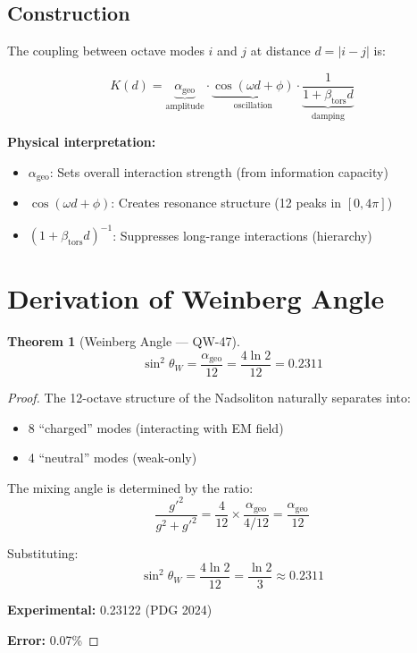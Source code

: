 \documentclass[11pt, a4paper]{article}
\newtheorem{theorem}{Theorem}[section]
\theoremstyle{remark}
\newcommand{\alphageo}{\alpha_{\text{geo}}}
\newcommand{\betators}{\beta_{\text{tors}}}
\begin{document}
\subsection{Construction}

The coupling between octave modes $i$ and $j$ at distance $d = |i - j|$ is:

\begin{equation}
K(d) = \underbrace{\alphageo}_{\text{amplitude}} \cdot \underbrace{\cos(\omega d + \phi)}_{\text{oscillation}} \cdot \underbrace{\frac{1}{1 + \betators d}}_{\text{damping}}
\end{equation}

\textbf{Physical interpretation:}
\begin{itemize}
    \item $\alphageo$: Sets overall interaction strength (from information capacity)
    \item $\cos(\omega d + \phi)$: Creates resonance structure (12 peaks in $[0, 4\pi]$)
    \item $(1 + \betators d)^{-1}$: Suppresses long-range interactions (hierarchy)
\end{itemize}

\section{Derivation of Weinberg Angle}

\begin{theorem}[Weinberg Angle --- QW-47]
\begin{equation}
\sin^2\theta_W = \frac{\alphageo}{12} = \frac{4\ln 2}{12} = 0.2311
\end{equation}
\end{theorem}

\begin{proof}
The 12-octave structure of the Nadsoliton naturally separates into:
\begin{itemize}
    \item 8 ``charged'' modes (interacting with EM field)
    \item 4 ``neutral'' modes (weak-only)
\end{itemize}

The mixing angle is determined by the ratio:
\begin{equation}
\frac{g'^2}{g^2 + g'^2} = \frac{4}{12} \times \frac{\alphageo}{4/12} = \frac{\alphageo}{12}
\end{equation}

Substituting:
\begin{equation}
\sin^2\theta_W = \frac{4\ln 2}{12} = \frac{\ln 2}{3} \approx 0.2311
\end{equation}

\textbf{Experimental:} 0.23122 (PDG 2024)

\textbf{Error:} 0.07\%
\end{proof}
\end{document}
